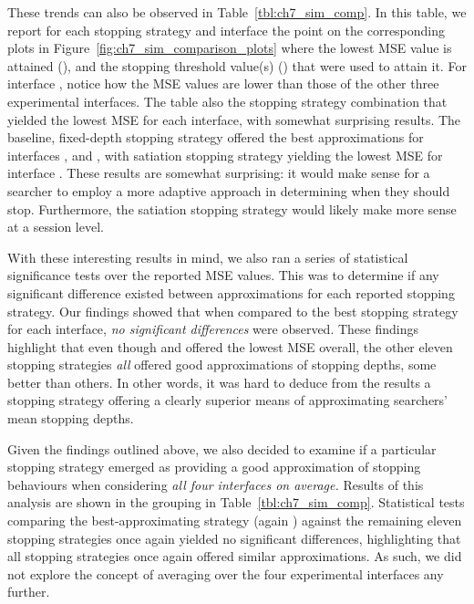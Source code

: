 These trends can also be observed in Table~\ref{tbl:ch7_sim_comp}. In this table, we report for each stopping strategy and interface the point on the corresponding plots in Figure~\ref{fig:ch7_sim_comparison_plots} where the lowest MSE value is attained (), and the stopping threshold value(s) () that were used to attain it. For interface , notice how the MSE values are lower than those of the other three experimental interfaces. The table also  the stopping strategy combination that yielded the lowest MSE for each interface, with somewhat surprising results. The baseline, fixed-depth stopping strategy  offered the best approximations for interfaces ,  and , with satiation stopping strategy  yielding the lowest MSE for interface . These results are somewhat surprising: it would make sense for a searcher to employ a more adaptive approach in determining when they should stop. Furthermore, the satiation stopping strategy would likely make more sense at a session level.


With these interesting results in mind, we also ran a series of statistical significance tests over the reported MSE values. This was to determine if any significant difference existed between approximations for each reported stopping strategy. Our findings showed that when compared to the best stopping strategy for each interface, \emph{no significant differences} were observed. These findings highlight that even though  and  offered the lowest MSE overall, the other eleven stopping strategies \emph{all} offered good approximations of stopping depths, some better than others. In other words, it was hard to deduce from the results a stopping strategy offering a clearly superior means of approximating searchers' mean stopping depths.

Given the findings outlined above, we also decided to examine if a particular stopping strategy emerged as providing a good approximation of stopping behaviours when considering \emph{all four interfaces on average.} Results of this analysis are shown in the  grouping in Table~\ref{tbl:ch7_sim_comp}. Statistical tests comparing the best-approximating strategy (again ) against the remaining eleven stopping strategies once again yielded no significant differences, highlighting that all stopping strategies once again offered similar approximations. As such, we did not explore the concept of averaging over the four experimental interfaces any further.

